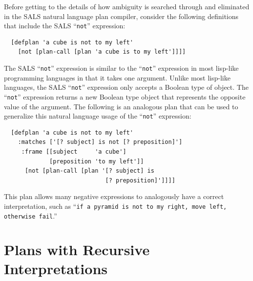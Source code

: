 Before getting to the details of how ambiguity is searched through and
eliminated in the SALS natural language plan compiler, consider the
following definitions that include the SALS ``{\tt{not}}'' expression:
\begin{samepage}
\begin{Verbatim}
  [defplan 'a cube is not to my left'
    [not [plan-call [plan 'a cube is to my left']]]]
\end{Verbatim}
\end{samepage}
The SALS ``{\tt{not}}'' expression is similar to the ``{\tt{not}}''
expression in most lisp-like programming languages in that it takes
one argument.  Unlike most lisp-like languages, the SALS
``{\tt{not}}'' expression only accepts a Boolean type of object.  The
``{\tt{not}}'' expression returns a new Boolean type object that
represents the opposite value of the argument.  The following is an
analogous plan that can be used to generalize this natural language
usage of the ``{\tt{not}}'' expression:
\begin{samepage}
\begin{Verbatim}
  [defplan 'a cube is not to my left'
    :matches ['[? subject] is not [? preposition]']
     :frame [[subject     'a cube']
             [preposition 'to my left']]
      [not [plan-call [plan '[? subject] is
                             [? preposition]']]]]
\end{Verbatim}
\end{samepage}
This plan allows many negative expressions to analogously have a
correct interpretation, such as ``{\tt{if a pyramid is not to my
    right, move left, otherwise fail}}.''

\section{Plans with Recursive Interpretations}

